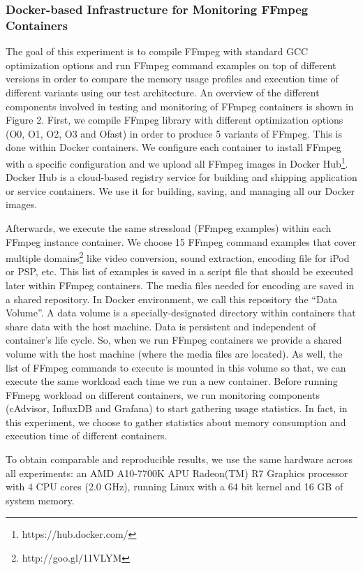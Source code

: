 \subsubsection{Docker-based Infrastructure for Monitoring FFmpeg Containers}


The goal of this experiment is to compile FFmpeg with standard GCC optimization options and run FFmpeg command examples on top of different versions in order to compare the memory usage profiles and execution time of different variants using our test architecture. An overview of the different components involved in testing and monitoring of FFmpeg containers is shown in Figure 2. 
First, we compile FFmpeg library with different optimization options  (O0, O1, O2, O3 and Ofast) in order to produce 5 variants of FFmpeg. This is done within Docker containers. We configure each container to install FFmpeg with a specific configuration and we upload all FFmpeg images in Docker Hub\footnote{https://hub.docker.com/}.
Docker Hub is a cloud-based registry service for building and shipping application or service containers. We use it for building, saving, and managing all our Docker images.

Afterwards, we execute the same stressload (FFmpeg examples) within each FFmpeg instance container. We choose 15 FFmpeg command examples that cover multiple domains\footnote{http://goo.gl/11VLYM} like video conversion, sound extraction, encoding file for iPod or PSP, etc. This list of examples is saved in a script file that should be executed later within FFmpeg containers. The media files needed for encoding are saved in a shared repository. In Docker environment, we call this repository the “Data Volume”. A data volume is a specially-designated directory within containers that share data with the host machine. Data is persistent and independent of container's life cycle. So, when we run FFmpeg containers we provide a shared volume with the host machine (where the media files are located). As well, the list of FFmpeg commands to execute is mounted in this volume so that, we can execute the same workload each time we run a new container.
Before running FFmepg workload on different containers, we run monitoring components (cAdvisor, InfluxDB and Grafana) to start gathering usage statistics.
In fact, in this experiment, we choose to gather statistics about memory consumption and execution time of different containers. 

To obtain comparable and reproducible results, we use the same hardware across all experiments: an AMD A10-7700K APU Radeon(TM) R7 Graphics processor with 4 CPU cores (2.0 GHz), running Linux with a 64 bit kernel and 16 GB of system memory.

